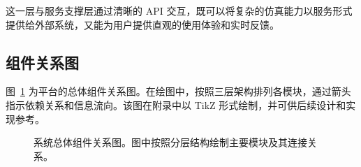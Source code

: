 这一层与服务支撑层通过清晰的 API 交互，既可以将复杂的仿真能力以服务形式提供给外部系统，又能为用户提供直观的使用体验和实时反馈。

\subsection{组件关系图}

图~\ref{fig:component_overview} 为平台的总体组件关系图。在绘图中，按照三层架构排列各模块，通过箭头指示依赖关系和信息流向。该图在附录中以 TikZ 形式绘制，并可供后续设计和实现参考。

\begin{figure}[htbp]
  \centering
  \resizebox{0.95\linewidth}{!}{}
  \caption{系统总体组件关系图。图中按照分层结构绘制主要模块及其连接关系。}
  \label{fig:component_overview}
\end{figure}